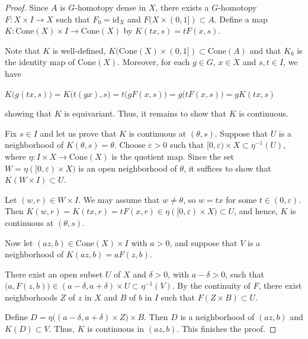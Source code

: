 \documentclass[12pt]{amsart}
\theoremstyle{definition}
\begin{document}
	\begin{proof}
		Since $A$ is $G$-homotopy dense in $X$, there exists a $G$-homotopy $F: X\times I\rightarrow X
		$ such that $F_0=\mbox{id}_X$ and $F(X\times (0,1])\subset A$. Define a  map $K:\mathrm{Cone}(X)\times I\rightarrow \mathrm{Cone}(X)$ by $K(tx,s)=tF(x,s)$. 
		
		Note that $K$ is well-defined,  $K(\mathrm{Cone}(X)\times (0,1])\subset \mathrm{Cone}(A)$ and that $K_0$ is the identity map of $\mathrm{Cone}(X)$. Moreover, for each $g\in G$, $x\in X$ and $s,t\in I$, we have
		
		\begin{center}
			$K\big(g(tx,s)\big)=K\big(t(gx),s\big)=t\big(gF(x,s)\big)= g\big(tF(x,s)\big)=gK(tx,s)$
		\end{center}
		showing that $K$ is equivariant. Thus, it remains to show that $K$ is continuous.
		 
		Fix $s\in I$ and let us prove that $K$ is continuous at $(\theta,s)$. Suppose that $U$ is a neighborhood of $K(\theta,s)=\theta$. Choose $\varepsilon>0$ such that  $[0,\varepsilon)\times X\subset \eta^{-1}(U)$, where $\eta:I \times X\rightarrow \mathrm{Cone}(X)$ is the quotient map. Since the set $W=\eta([0,\varepsilon)\times X)$ is an open neighborhood of $\theta$, it suffices to show that $K(W\times I)\subset U$.
		
		Let $(w,r)\in W\times I$. We may assume that $w\neq \theta$, so $w=tx$ for some $t\in (0,\varepsilon)$. Then $K(w,r)=K(tx,r)=tF(x,r)\in \eta([0,\varepsilon)\times X)\subset U$, and hence, $K$ is continuous at $(\theta,s)$.
		
		Now let $(az,b)\in \mathrm{Cone}(X)\times I$ with $a>0$, and suppose that $V$ is a neighborhood of $K(az,b)=aF(z,b)$. 
		
		There exist an open subset $U$ of $X$ and $\delta>0$, with $a-\delta>0$, such that $\big(a,F(z,b)\big)\in (a-\delta,a+\delta)\times U\subset \eta^{-1}(V)$. By the continuity of $F$, there exist neighborhoods $Z$ of $z$ in $X$ and $B$ of $b$ in $I$ such that $F(Z\times B)\subset U$.
		
		Define $D=\eta\big((a-\delta,a+\delta)\times Z\big)\times B$. Then $D$ is a neighborhood of $(az,b)$ and $K(D)\subset V$. Thus, $K$ is continuous in $(az,b)$. This finishes the proof.
		
	\end{proof} 
	
\end{document}
